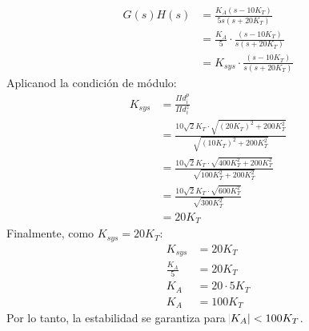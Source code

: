 \documentclass[
  11pt,
  letterpaper,
   addpoints,
   answers
  ]{exam}
\begin{document}
\begin{questions}
\begin{solution}
\begin{enumerate}
    \begin{align}
        G(s)H(s)&=\frac{K_A(s-10K_T)}{5s(s+20K_T)} \nonumber\\
        &=\frac{K_A}{5}\cdot\frac{(s-10K_T)}{s(s+20K_T)} \nonumber\\
        &=K_{sys}\cdot \frac{(s-10K_T)}{s(s+20K_T)} \nonumber
    \end{align}
    Aplicanod la condición de módulo:
    \begin{align}
        K_{sys}&=\frac{\Pi d_{i}^p}{\Pi d_{i}^z} \nonumber \\
        &=\frac{10\sqrt{2}K_T \cdot \sqrt{(20K_T)^2+200K_T^2}}{\sqrt{(10K_T)^2+200K_T^2}} \nonumber\\
        &=\frac{10\sqrt{2}K_T\cdot\sqrt{400K_T^2+200K_T^2}}{\sqrt{100K_T^2+200K_T^2}} \nonumber\\
        &=\frac{10\sqrt{2}K_T \cdot \sqrt{600K_T^2}}{\sqrt{300K_T^2}} \nonumber \\
        &=20K_T \nonumber
    \end{align}
    Finalmente, como $K_{sys}=20K_T$:
    \begin{align}
        K_{sys}&=20K_T \nonumber\\
        \frac{K_A}{5}&=20K_T \nonumber \\
        K_A&=20\cdot 5K_T \nonumber\\
        K_A&=100K_T \nonumber
    \end{align}
    Por lo tanto, la estabilidad se garantiza para $\abs{K_A}<100K_T$.
\end{enumerate}

\end{solution}
\end{questions}
\end{document}
